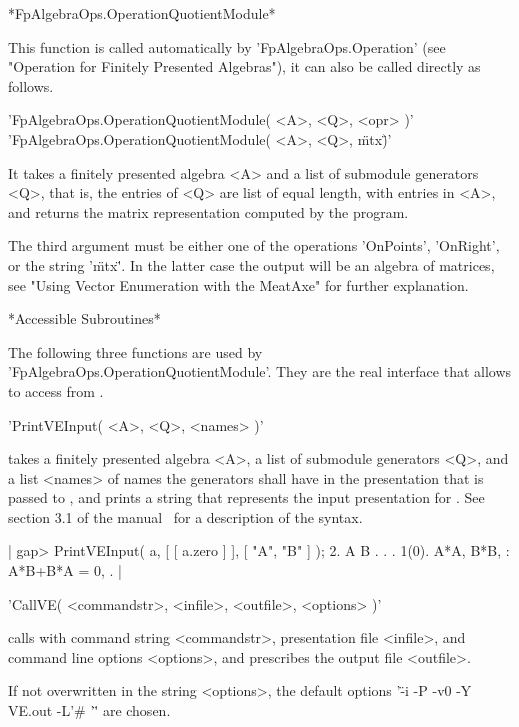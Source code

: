 \vspace{5mm}

*FpAlgebraOps.OperationQuotientModule*

This function is called automatically by 'FpAlgebraOps.Operation'
(see "Operation for Finitely Presented Algebras"),
it can also be called directly as follows.

'FpAlgebraOps.OperationQuotientModule( <A>, <Q>, <opr> )'\\
'FpAlgebraOps.OperationQuotientModule( <A>, <Q>, \"mtx\" )'

It takes a finitely presented algebra <A> and a list of submodule
generators <Q>, that is, the entries of <Q> are list of equal length,
with entries in <A>, and returns the matrix representation computed by
the {\VE} program.

The third argument must be either one of the operations 'OnPoints',
'OnRight', or the string '\"mtx\"'.  In the latter case the output will
be an algebra of {\MeatAxe} matrices, see "Using Vector Enumeration with
the MeatAxe" for further explanation.

\vspace{5mm}

*Accessible Subroutines*

The following three functions are used by
'FpAlgebraOps.OperationQuotientModule'.
They are the real interface that allows to access {\VE} from {\GAP}.

'PrintVEInput( <A>, <Q>, <names> )'

takes a finitely presented algebra <A>, a list of submodule generators
<Q>, and a list <names> of names the generators shall have in the
presentation that is passed to {\VE}, and prints a string that represents
the input presentation for {\VE}.
See section 3.1 of the {\VE} manual~\cite{Lin93} for a description of
the syntax.

|    gap> PrintVEInput( a, [ [ a.zero ] ], [ "A", "B" ] );
    2.
    A B .
    .
    .
    {1}(0).
    A*A, B*B, :
    A*B+B*A = 0, .  |

\vspace{5mm}

'CallVE( <commandstr>, <infile>, <outfile>, <options> )'

calls {\VE} with command string <commandstr>, presentation file
<infile>, and command line options <options>, and prescribes the
output file <outfile>.

If not overwritten in the string <options>, the default options
'\"-i -P -v0 -Y VE.out -L'\#  '\"' are chosen.

